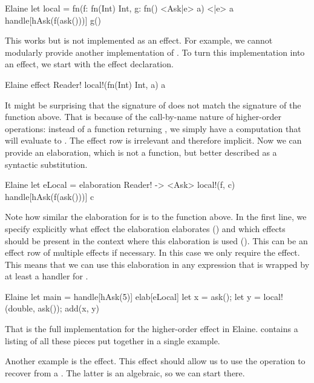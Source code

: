 \begin{lst}{Elaine}
let local = fn(f: fn(Int) Int, g: fn() <Ask|e> a) <|e> a {
    handle[hAsk(f(ask()))] { g() }
}
\end{lst}

This works but is not implemented as an effect. For example, we cannot modularly provide another implementation of . To turn this implementation into an effect, we start with the effect declaration.

\begin{lst}{Elaine}
effect Reader! {
    local!(fn(Int) Int, a) a
}
\end{lst}

It might be surprising that the signature of  does not match the signature of the function above. That is because of the call-by-name nature of higher-order operations: instead of a function returning , we simply have a computation that will evaluate to . The effect row is irrelevant and therefore implicit. Now we can provide an elaboration, which is not a function, but better described as a syntactic substitution.

\begin{lst}{Elaine}
let eLocal = elaboration Reader! -> <Ask> {
    local!(f, c) {
        handle[hAsk(f(ask()))] c
    }
}
\end{lst}

Note how similar the elaboration for  is to the  function above. In the first line, we specify explicitly what effect the elaboration elaborates () and which effects should be present in the context where this elaboration is used (). This can be an effect row of multiple effects if necessary. In this case we only require the  effect. This means that we can use this elaboration in any expression that is wrapped by at least a handler for .

\begin{lst}{Elaine}
let main = handle[hAsk(5)] elab[eLocal] {
    let x = ask();
    let y = local!(double, ask());
    add(x, y)
}
\end{lst}

That is the full implementation for the higher-order  effect in Elaine.  contains a listing of all these pieces put together in a single example.

Another example is the  effect. This effect should allow us to use the  operation to recover from a . The latter is an algebraic, so we can start there.

